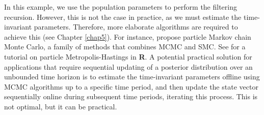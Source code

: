 In this example, we use the population parameters to perform the filtering recursion. However, this is not the case in practice, as we must estimate the time-invariant parameters. Therefore, more elaborate algorithms are required to achieve this (see Chapter \ref{chap5}). For instance, \cite{andrieu2010pmcmc} propose particle Markov chain Monte Carlo, a family of methods that combines MCMC and SMC. See \cite{dahlin2019getting} for a tutorial on particle Metropolis-Hastings in \textbf{R}. A potential practical solution for applications that require sequential updating of a posterior distribution over an unbounded time horizon is to estimate the time-invariant parameters offline using MCMC algorithms up to a specific time period, and then update the state vector sequentially online during subsequent time periods, iterating this process. This is not optimal, but it can be practical.


